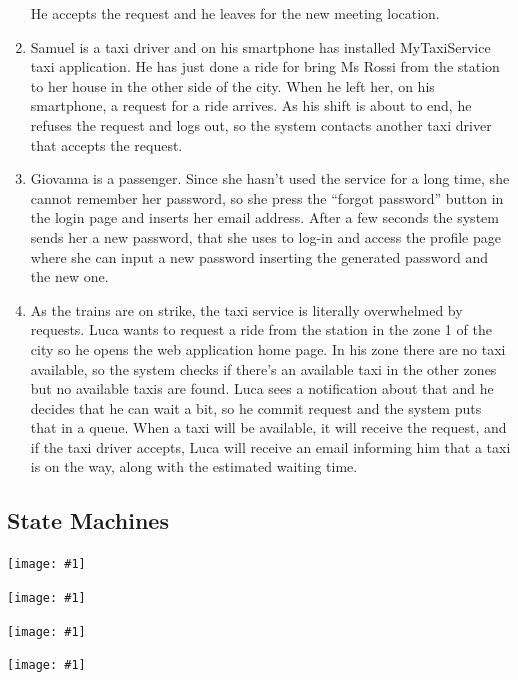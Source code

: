 \documentclass[11pt, a4paper,titlepage]{article}
\newcommand{\productname}{MyTaxiService }
\newcommand{\image}[1]{
	\begin{center}
		\noindent \texttt{[image: \#1]}
	\end{center}
	}
\begin{document}
\begin{enumerate}
	He accepts the request and he leaves for the new meeting location.
	\item Samuel is a taxi driver and on his smartphone has installed \productname taxi application.
	He has just done a ride for bring Ms Rossi from the station to her house in the other side of the city.
	When he left her, on his smartphone, a request for a ride arrives.
	As his shift is about to end, he refuses the request and logs out, so the system contacts another taxi driver that accepts the request.
	\item Giovanna is a passenger. Since she hasn’t used the service for a long time, she cannot remember her password, so she press the “forgot password” button in the login page and inserts her email address. After a few seconds the system sends her a new password, that she uses to log-in and access the profile page where she can input a new password inserting the generated password and the new one.
	\item As the trains are on strike, the taxi service is literally overwhelmed by requests.
	Luca wants to request a ride from the station in the zone 1 of the city so he opens the web application home page.
	In his zone there are no taxi available, so the system checks if there’s an available taxi in the other zones but no available taxis are found.\newline 
	Luca sees a notification about that and he decides that he can wait a bit, so he commit request and the system puts that in a queue. \newline
	When a taxi will be available, it will receive the request, and if the taxi driver accepts, Luca will receive an email informing him that a taxi is on the way, along with the estimated waiting time.
	
	
	
\end{enumerate}
\pagebreak
\subsection{State Machines}
	\image{diagram_state_machine1.png}
	\image{diagram_state_machine2.png}
	\image{diagram_state_machine3.png}
	\image{diagram_state_machine4.png}
\end{document}
